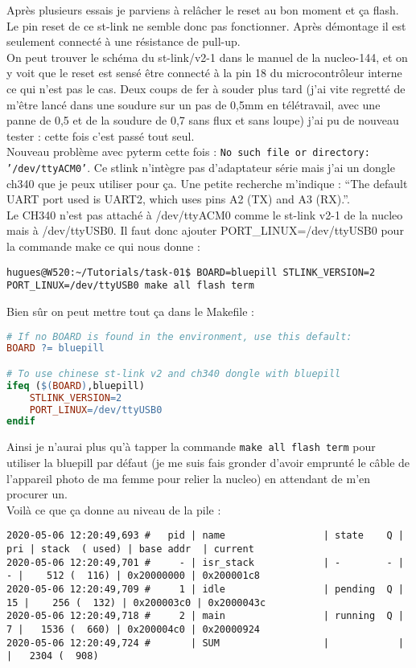 Après plusieurs essais je parviens à relâcher le reset au bon moment et ça flash. Le
pin reset de ce st-link ne semble donc pas fonctionner. Après démontage il est
seulement connecté à une résistance de pull-up.\\

On peut trouver le schéma du st-link/v2-1 dans le manuel de la nucleo-144, et on y
voit que le reset est sensé être connecté à la pin 18 du microcontrôleur interne ce
qui n'est pas le cas. Deux coups de fer à souder plus tard (j'ai vite regretté de
m'être lancé dans une soudure sur un pas de 0,5mm en télétravail, avec une panne de
0,5 et de la soudure de 0,7 sans flux et sans loupe) j'ai pu de nouveau
tester : cette fois c'est passé tout seul.\\

Nouveau problème avec pyterm cette fois : \texttt{No such file or directory:
'/dev/ttyACM0'}. Ce stlink n'intègre pas d'adaptateur série mais j'ai un dongle
ch340 que je peux utiliser pour ça. Une petite recherche m'indique : \enquote{The
default UART port used is UART2, which uses pins A2 (TX) and A3 (RX).}.\\

Le CH340 n'est pas attaché à /dev/ttyACM0 comme le st-link v2-1 de la nucleo mais à
/dev/ttyUSB0. Il faut donc ajouter PORT\_LINUX=/dev/ttyUSB0 pour la commande make ce
qui nous donne :
{\scriptsize
\begin{verbatim}
hugues@W520:~/Tutorials/task-01$ BOARD=bluepill STLINK_VERSION=2 PORT_LINUX=/dev/ttyUSB0 make all flash term
\end{verbatim}
}
Bien sûr on peut mettre tout ça dans le Makefile :
\begin{lstlisting}[language=make]
# If no BOARD is found in the environment, use this default:
BOARD ?= bluepill

# To use chinese st-link v2 and ch340 dongle with bluepill
ifeq ($(BOARD),bluepill)
	STLINK_VERSION=2
	PORT_LINUX=/dev/ttyUSB0
endif
\end{lstlisting}

Ainsi je n'aurai plus qu'à tapper la commande \texttt{make all flash term} pour
utiliser la bluepill par défaut (je me suis fais gronder d'avoir emprunté le câble
de l'appareil photo de ma femme pour relier la nucleo) en attendant de m'en
procurer un.\\

Voilà ce que ça donne au niveau de la pile :
{\scriptsize
\begin{verbatim}
2020-05-06 12:20:49,693 # 	pid | name                 | state    Q | pri | stack  ( used) | base addr  | current     
2020-05-06 12:20:49,701 # 	  - | isr_stack            | -        - |   - |    512 (  116) | 0x20000000 | 0x200001c8
2020-05-06 12:20:49,709 # 	  1 | idle                 | pending  Q |  15 |    256 (  132) | 0x200003c0 | 0x2000043c 
2020-05-06 12:20:49,718 # 	  2 | main                 | running  Q |   7 |   1536 (  660) | 0x200004c0 | 0x20000924 
2020-05-06 12:20:49,724 # 	    | SUM                  |            |     |   2304 (  908)
\end{verbatim}
}

